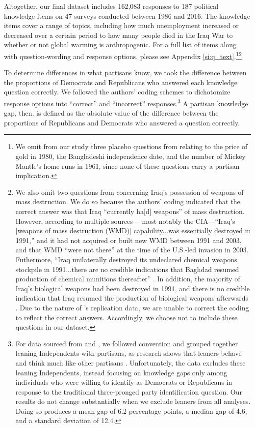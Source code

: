 \documentclass[12pt, letterpaper]{article}
\begin{document}
Altogether, our final dataset includes 162,083 responses to 187 political knowledge items on 47 surveys conducted between 1986 and 2016. The knowledge items cover a range of topics, including how much unemployment increased or decreased over a certain period to how many people died in the Iraq War to whether or not global warming is anthropogenic. For a full list of items along with question-wording and response options, please see Appendix \ref{si:q_text}.\footnote{We omit from our study three placebo questions from \citet{bullocketal_2015} relating to the price of gold in 1980, the Bangladeshi independence date, and the number of Mickey Mantle's home runs in 1961, since none of these questions carry a partisan implication.}\footnote{We also omit two questions from \citet{jerit2012partisan} concerning Iraq's possession of weapons of mass destruction. We do so because the authors' coding indicated that the correct answer was that Iraq ``currently ha[d] weapons'' of mass destruction. However, according to multiple sources--- most notably the CIA---``Iraq's [weapons of mass destruction (WMD)] capability...was essentially destroyed in 1991,'' and it had not acquired or built new WMD between 1991 and 2003, and that WMD ``were not there'' at the time of the U.S.-led invasion in 2003. Futhermore, ``Iraq unilaterally destroyed its undeclared chemical weapons stockpile in 1991...there are no credible indications that Baghdad resumed production of chemical munitions thereafter'' \citep{cia_2004}. In addition, the majority of Iraq's biological weapons had been destroyed in 1991, and there is no credible indication that Iraq resumed the production of biological weapons afterwards \citep{cia_2004}. Due to the nature of \citet{jerit2012partisan}'s replication data, we are unable to correct the coding to reflect the correct answers. Accordingly, we choose not to include these questions in our dataset.}

To determine differences in what partisans know, we took the difference between the proportions of Democrats and Republicans who answered each knowledge question correctly. We followed the authors' coding schemes to dichotomize response options into ``correct'' and ``incorrect'' responses.\footnote{For data sourced from \citet{bullocketal_2015} and \citet{prior2015you}, we followed convention and grouped together leaning Independents with partisans, as research shows that leaners behave and think much like other partisans \citep{keithetal_1992}. Unfortunately, the \citet{jerit2012partisan} data excludes these leaning Independents, instead focusing on knowledge gaps only among individuals who were willing to identify as Democrats or Republicans in response to the traditional three-pronged party identification question. Our results do not change substantially when we exclude leaners from all analyses. Doing so produces a mean gap of 6.2 percentage points, a median gap of 4.6, and a standard deviation of 12.4.} A partisan knowledge gap, then, is defined as the absolute value of the difference between the proportions of Republicans and Democrats who answered a question correctly.
\end{document}

